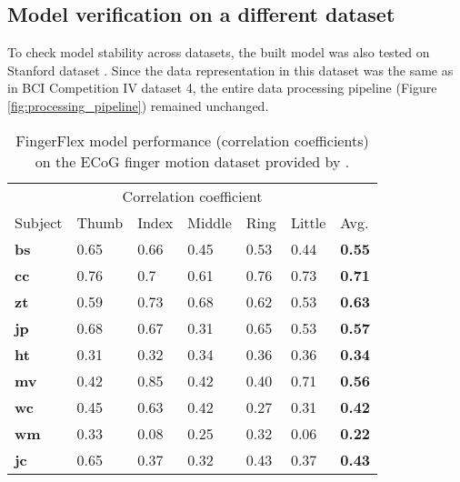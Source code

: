 \documentclass[letterpaper]{article} \usepackage{aaai22}  \usepackage{times}  \usepackage{helvet}  \usepackage{courier}  \usepackage[hyphens]{url}  \usepackage{graphicx} \urlstyle{rm} \def\UrlFont{\rm}  \usepackage{natbib}  \usepackage{caption} \DeclareCaptionStyle{ruled}{labelfont=normalfont,labelsep=colon,strut=off} \frenchspacing  \setlength{\pdfpagewidth}{8.5in}  \setlength{\pdfpageheight}{11in}  \usepackage{algorithm}
\begin{document}
\subsection{Model verification on a different dataset}
To check model stability across datasets, the built model was also tested on Stanford dataset \citep{miller2019}. Since the data representation in this dataset was the same as in BCI Competition IV dataset 4, the entire data processing pipeline (Figure \ref{fig:processing_pipeline}) remained unchanged. 

\begin{table}[h]
  \caption{ \label{table:stanford_performance} FingerFlex model performance (correlation coefficients) on the ECoG finger motion dataset provided by \citet{miller2019}.
  }
  \label{table:stanford_performance}
  \centering
  \begin{tabular}{m{}                  m{}                  m{}                  m{}                  m{}                  m{}                  m{}}
    \toprule
    \multicolumn{7}{c}{Correlation coefficient}\\                  
    \cmidrule(r){2-7}
    Subject & Thumb & Index & Middle & Ring & Little & Avg. \\
    \midrule
    \midrule
    \textbf{bs} & 0.65 & 0.66 & 0.45 & 0.53 & 0.44 &\textbf{0.55} \\
    \textbf{cc} & 0.76 & 0.7 & 0.61 & 0.76 & 0.73 &\textbf{0.71} \\
    \textbf{zt} & 0.59 & 0.73 & 0.68 & 0.62 & 0.53 &\textbf{0.63} \\
    \textbf{jp} & 0.68 & 0.67 & 0.31 & 0.65 & 0.53 &\textbf{0.57} \\
    \textbf{ht} & 0.31 & 0.32 & 0.34 & 0.36 & 0.36 &\textbf{0.34} \\
    \textbf{mv} & 0.42 & 0.85 & 0.42 & 0.40 & 0.71 &\textbf{0.56} \\
    \textbf{wc} & 0.45 & 0.63 & 0.42 & 0.27 & 0.31 &\textbf{0.42} \\
    \textbf{wm} & 0.33 & 0.08 & 0.25 & 0.32 & 0.06 &\textbf{0.22} \\
    \textbf{jc} & 0.65 & 0.37 & 0.32 & 0.43 & 0.37 &\textbf{0.43} \\
    \bottomrule
  \end{tabular}
\end{table}
\end{document}
